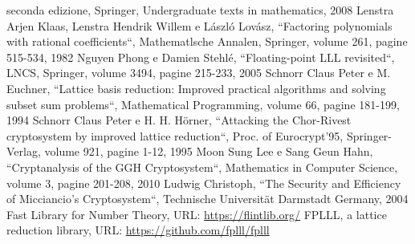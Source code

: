 \documentclass[a4paper,12pt]{report}
\theoremstyle{definition}
\begin{document}
\begin{thebibliography}{}
    seconda edizione, Springer, Undergraduate texts in mathematics, 2008
    Lenstra Arjen Klaas, Lenstra Hendrik Willem e László Lovász, 
    “Factoring polynomials with rational coefficients“, Mathematlsche Annalen, Springer, 
    volume 261, pagine 515-534, 1982
    Nguyen Phong e Damien Stehlé, “Floating-point LLL revisited“, LNCS, Springer, 
    volume 3494, pagine 215-233, 2005
    Schnorr Claus Peter e M. Euchner, 
    “Lattice basis reduction: Improved practical algorithms and solving subset sum problems“,
    Mathematical Programming, volume 66, pagine 181-199, 1994
    Schnorr Claus Peter e H. H. Hörner, 
    “Attacking the Chor-Rivest cryptosystem by improved lattice reduction“,
    Proc. of Eurocrypt'95, Springer-Verlag, volume 921, pagine 1-12, 1995
    Moon Sung Lee e Sang Geun Hahn, “Cryptanalysis of the GGH Cryptosystem“,
    Mathematics in Computer Science, volume 3, pagine 201-208, 2010
    Ludwig Christoph, “The Security and Efficiency of Micciancio’s
    Cryptosystem“, Technische Universität Darmstadt Germany, 2004
    Fast Library for Number Theory, URL: \url{https://flintlib.org/}
    FPLLL, a lattice reduction library, URL: \url{https://github.com/fplll/fplll}
   
\end{thebibliography}
% 
\end{document}
